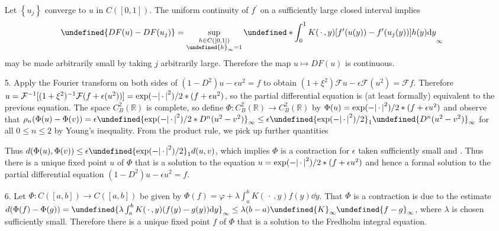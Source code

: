 \documentclass[11pt,leqno]{article}
\theoremstyle{plain}
\theoremstyle{definition}
\numberwithin{equation}{section}
\numberwithin{lem}{section}
\newcommand{\cbr}[1]{\left\{#1\right\}}
\let\norm\undefined %
\DeclarePairedDelimiter\norm{\lVert}{\rVert}
\begin{document}
\begin{enumerate}

    Let $\cbr{u_j}$ converge to $u$ in $C([0,1])$. The uniform continuity of $f^\prime$ on a sufficiently large closed interval implies
    \[\norm{DF(u)-DF(u_j)} = \sup_{\substack{h\in C([0,1])\\ \norm{h}_\infty = 1}}\norm*{\int_0^1K(\,\cdot\, ,y)[f^\prime(u(y))- f^\prime(u_j(y))]h(y)\dd y}_\infty\] may be made arbitrarily small by taking $j$ arbitrarily large. Therefore the map $u\mapsto DF(u)$ is continuous.
    \item[5.] Apply the Fourier transform on both sides of $(1-D^2)u - \epsilon u^2 = f$ to obtain $(1+\xi^2)\mathcal F u - \epsilon \mathcal F(u^2) = \mathcal F f$. Therefore $u = \mathcal F^{-1}[(1+\xi^2)^{-1}\mathcal F(f+\epsilon (u^2))] = \exp\relax(-\abs{\,\cdot\,}^2)/2\ast (f+\epsilon u^2)$, so the partial differential equation is (at least formally) equivalent to the previous equation. The space $C^2_B(\mathbb R)$ is complete, so define $\Phi\colon C^2_B(\mathbb R)\to C^2_B(\mathbb R)$ by $\Phi(u) = \exp\relax(-\abs{\,\cdot\,}^2)/2\ast (f+\epsilon u^2)$ and observe that $\rho_n(\Phi(u)-\Phi(v)) = \epsilon\norm{\exp\relax(-\abs{\,\cdot\,}^2)/2\ast D^n(u^2-v^2)}_\infty \leq \epsilon\norm{\exp\relax(-\abs{\,\cdot\,}^2)/2}_1\norm{D^n(u^2-v^2)}_\infty$ for all $0\leq n\leq 2$ by Young's inequality. From the product rule, we pick up further quantities 
    
    Thus $d(\Phi(u),\Phi(v))\leq \epsilon\norm{\exp\relax(-\abs{\,\cdot\,}^2)/2}_1d(u,v)$, which implies $\Phi$ is a contraction for $\epsilon$ taken sufficiently small and . Thus there is a unique fixed point $u$ of $\Phi$ that is a solution to the equation $u = \exp\relax(-\abs{\,\cdot\,}^2)/2\ast (f+\epsilon u^2)$ and hence a formal solution to the partial differential equation $(1-D^2)u - \epsilon u^2 = f$.
    \item[6.] Let $\Phi\colon C([a,b])\to C([a,b])$ be given by $\Phi(f) = \varphi + \lambda\int_a^b K(\,\cdot\,,y)f(y)\dd y$. That $\Phi$ is a contraction is due to the estimate $d(\Phi(f)-\Phi(g)) = \norm{\lambda\int_a^bK(\,\cdot\,,y)(f(y)-g(y))\dd y}_\infty\leq \lambda(b-a)\norm{K}_\infty\norm{f-g}_\infty$, where $\lambda$ is chosen sufficiently small. Therefore there is a unique fixed point $f$ of $\Phi$ that is a solution to the Fredholm integral equation.
\end{enumerate}
\end{document}
